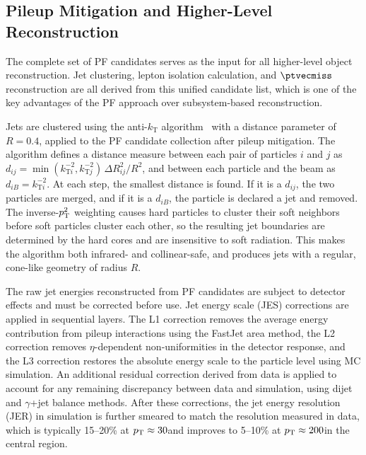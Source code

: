 \subsection*{Pileup Mitigation and Higher-Level Reconstruction}

The complete set of PF candidates serves as the input for all higher-level object reconstruction. Jet clustering, lepton isolation calculation, and $\ptvecmiss$ reconstruction are all derived from this unified candidate list, which is one of the key advantages of the PF approach over subsystem-based reconstruction.

Jets are clustered using the anti-$k_{\mathrm{T}}$ algorithm~\cite{Cacciari:2008gp} with a distance parameter of $R = 0.4$, applied to the PF candidate collection after pileup mitigation. The algorithm defines a distance measure between each pair of particles $i$ and $j$ as $d_{ij} = \min(k_{\mathrm{T}i}^{-2}, k_{\mathrm{T}j}^{-2})\,\Delta R_{ij}^2 / R^2$, and between each particle and the beam as $d_{iB} = k_{\mathrm{T}i}^{-2}$. At each step, the smallest distance is found. If it is a $d_{ij}$, the two particles are merged, and if it is a $d_{iB}$, the particle is declared a jet and removed. The inverse-$p_{\mathrm{T}}^2$ weighting causes hard particles to cluster their soft neighbors before soft particles cluster each other, so the resulting jet boundaries are determined by the hard cores and are insensitive to soft radiation. This makes the algorithm both infrared- and collinear-safe, and produces jets with a regular, cone-like geometry of radius $R$.

The raw jet energies reconstructed from PF candidates are subject to detector effects and must be corrected before use. Jet energy scale (JES) corrections are applied in sequential layers. The L1 correction removes the average energy contribution from pileup interactions using the FastJet area method, the L2 correction removes $\eta$-dependent non-uniformities in the detector response, and the L3 correction restores the absolute energy scale to the particle level using MC simulation. An additional residual correction derived from data is applied to account for any remaining discrepancy between data and simulation, using dijet and $\gamma$+jet balance methods. After these corrections, the jet energy resolution (JER) in simulation is further smeared to match the resolution measured in data, which is typically 15--20\% at $p_{\mathrm{T}} \approx 30$\GeV and improves to 5--10\% at $p_{\mathrm{T}} \approx 200$\GeV in the central region.

